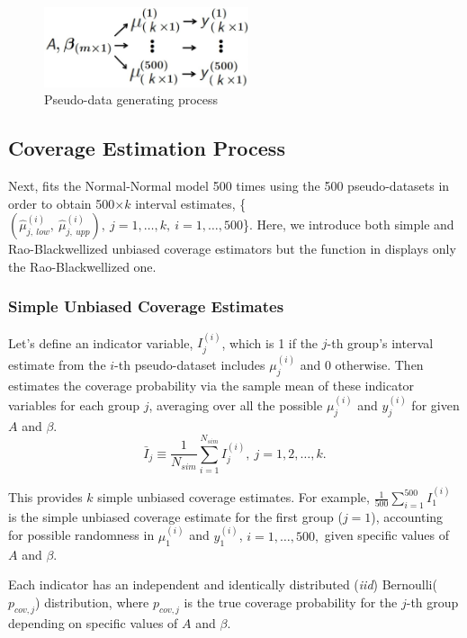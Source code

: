 \documentclass[article]{jss}
\begin{document}
\begin{figure}[h]
\begin{center}
\includegraphics[width=6cm]{process.png}
\caption{Pseudo-data generating process}
\label{fig:pseudo}
\end{center}
\end{figure}

\subsection{Coverage Estimation Process}
Next,  fits the Normal-Normal model 500 times using the 500 pseudo-datasets in order to obtain 500$\times k$ interval estimates,  \{$(\hat{\mu}^{(i)}_{j, ~low}, ~\hat{\mu}^{(i)}_{j, ~upp}), ~j=1,\ldots, k,~ i=1, \ldots, 500$\}.  Here, we introduce both simple and Rao-Blackwellized unbiased coverage estimators but the function  in  displays only the Rao-Blackwellized one.

\subsubsection{Simple Unbiased Coverage Estimates}
Let's define an indicator variable, $I^{(i)}_{j}$, which is 1 if the $j$-th group's interval estimate from the $i$-th pseudo-dataset includes $\mu^{(i)}_{j}$ and 0 otherwise. Then  estimates the coverage probability via the sample mean of these indicator variables for each group $j$, averaging over all the possible $\mu^{(i)}_{j}$ and $y^{(i)}_{j}$ for given $A$ and $\beta$. 
\begin{equation}
\bar{I}_{j}\equiv \frac{1}{N_{sim}}\sum_{i=1}^{N_{sim}}I^{(i)}_{j},~ j=1, 2, \ldots, k.
\end{equation}

This provides $k$ simple unbiased coverage estimates. For example, $\frac{1}{500}\sum_{i=1}^{500}I^{(i)}_{1}$ is the simple unbiased coverage estimate for the first group ($j=1$), accounting for possible randomness in $\mu^{(i)}_{1}$ and $y^{(i)}_{1}$, $i=1, \ldots, 500,$ given specific values of $A$ and $\beta$. 

Each indicator has an independent and identically distributed (\emph{iid}) Bernoulli($p_{cov, j}$) distribution, where $p_{cov, j}$ is the true coverage probability for the $j$-th group depending on specific values of $A$ and $\beta$. 
\end{document}
